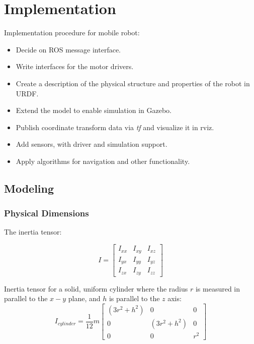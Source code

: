\chapter{Implementation}
\label{chp:implementation} 

Implementation procedure for mobile robot:

\begin{itemize}

	\item Decide on ROS message interface.
	\item Write interfaces for the motor drivers.
	\item Create a description of the physical structure and properties of the robot in \ac{URDF}. 
	\item Extend the model to enable simulation in Gazebo.
	\item Publish coordinate transform data via \textit{tf} and visualize it in rviz.
	\item Add sensors, with driver and simulation support.
	\item Apply algorithms for navigation and other functionality. 

\end{itemize}

\section{Modeling}

\subsection{Physical Dimensions}

The inertia tensor:

\begin{equation}
    	I = \begin{bmatrix}
    	I_{xx} & I_{xy} & I_{xz} \\[0.3em]
    	I_{yx} & I_{yy} & I_{yz} \\[0.3em]
    	I_{zx} & I_{zy} & I_{zz}
    	\end{bmatrix}
\end{equation}

Inertia tensor for a solid, uniform cylinder where the radius $r$ is measured in parallel to the $x - y$ plane, and $h$ is parallel to the $z$ axis:
\begin{equation}
I_{cylinder} = \frac{1}{12}m \begin{bmatrix}
	(3 r^2 + h^2) & 0 & 0 \\[0.3em]
	0 & (3 r^2 + h^2) & 0 \\[0.3em]
	0 & 0 & r^2
	\end{bmatrix}
\end{equation}

